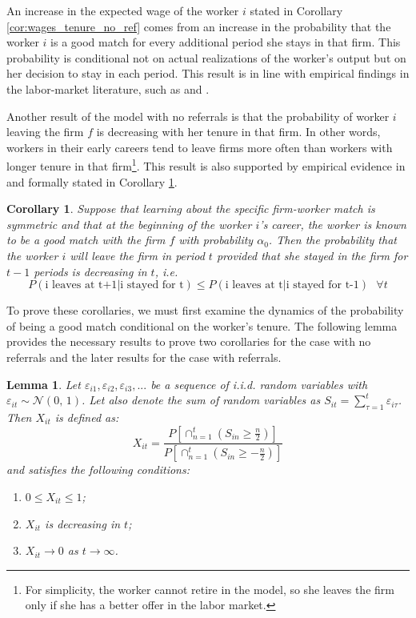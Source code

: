 \documentclass[12pt]{article}
\newtheorem{lemma}{Lemma}
\newtheorem{corollary}[theorem]{Corollary}
\begin{document}
An increase in the expected wage of the worker $i$ stated in Corollary  \ref{cor:wages_tenure_no_ref} comes from an increase in the probability that the worker $i$ is a good match for every additional period she stays in that firm. This probability is conditional not on actual realizations of the worker's output but on her decision to stay in each period. This result is in line with empirical findings in the labor-market literature, such as \cite{brown1989wages} and \cite{mccue1996promotions}.

Another result of the model with no referrals is that the probability of worker $i$ leaving the firm $f$ is decreasing with her tenure in that firm. In other words, workers in their early careers tend to leave firms more often than workers with longer tenure in that firm\footnote{For simplicity, the worker cannot retire in the model, so she leaves the firm only if she has a better offer in the labor market.}. This result is also supported by empirical evidence in \cite{mincer1981labor} and formally stated in Corollary \ref{cor:leave_decrease_t}.

\begin{corollary}\label{cor:leave_decrease_t}
Suppose that learning about the specific firm-worker match is symmetric and that at the beginning of the worker $i$'s career, the worker is known to be a good match with the firm $f$ with probability $\alpha_0$. Then the probability that the worker $i$ will leave the firm in period $t$ provided that she stayed in the firm for $t-1$  periods is decreasing in $t$, i.e.
$$
P(\text{i leaves at t+1}\vert \text{i stayed for t})\leq P(\text{i leaves at t}\vert \text{i stayed for t-1}) \text{ }\forall t
$$
\end{corollary}

To prove these corollaries, we must first examine the dynamics of the probability of being a good match conditional on the worker's tenure. The following lemma provides the necessary results to prove two corollaries for the case with no referrals and the later results for the case with referrals.


\begin{lemma}\label{lemma:main}
Let $\varepsilon_{i1}, \varepsilon_{i2},\varepsilon_{i3},...$ be a sequence of i.i.d. random variables with $\varepsilon_{it} \sim \mathcal{N}(0,\,1)$. Let also denote the sum of random variables as $S_{it} = \sum_{\tau=1}^{t} \varepsilon_{i\tau}$. Then $X_{it}$ is defined as:
\begin{equation}\label{eq:X_t}
X_{it} = \frac{P\left[ \cap_{n=1}^{t}(S_{in}\geq \frac{n}{2}) \right] }
{P\left[ \cap_{n=1}^{t}(S_{in}\geq -\frac{n}{2}) \right] }
\end{equation}
and satisfies the following conditions:
\begin{enumerate}[label={\roman*})]
\item $0\leq X_{it} \leq 1$;
\item $X_{it}$ is decreasing in $t$;
\item $X_{it} \rightarrow 0$ as $t \rightarrow \infty$.
\end{enumerate}
\end{lemma}
\end{document}
